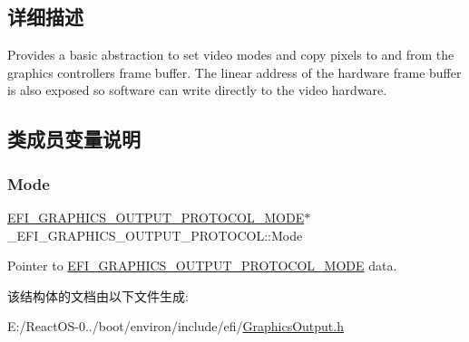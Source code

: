 \subsection{详细描述}
Provides a basic abstraction to set video modes and copy pixels to and from the graphics controller\textquotesingle{}s frame buffer. The linear address of the hardware frame buffer is also exposed so software can write directly to the video hardware. 

\subsection{类成员变量说明}
\mbox{\label{struct___e_f_i___g_r_a_p_h_i_c_s___o_u_t_p_u_t___p_r_o_t_o_c_o_l_ae5fe3c5d2a77b3e1de618adfb0f2e20a}} 
\subsubsection{\texorpdfstring{Mode}{Mode}}
{\footnotesize\ttfamily \hyperlink{struct_e_f_i___g_r_a_p_h_i_c_s___o_u_t_p_u_t___p_r_o_t_o_c_o_l___m_o_d_e}{E\+F\+I\+\_\+\+G\+R\+A\+P\+H\+I\+C\+S\+\_\+\+O\+U\+T\+P\+U\+T\+\_\+\+P\+R\+O\+T\+O\+C\+O\+L\+\_\+\+M\+O\+DE}$\ast$ \+\_\+\+E\+F\+I\+\_\+\+G\+R\+A\+P\+H\+I\+C\+S\+\_\+\+O\+U\+T\+P\+U\+T\+\_\+\+P\+R\+O\+T\+O\+C\+O\+L\+::\+Mode}

Pointer to \hyperlink{struct_e_f_i___g_r_a_p_h_i_c_s___o_u_t_p_u_t___p_r_o_t_o_c_o_l___m_o_d_e}{E\+F\+I\+\_\+\+G\+R\+A\+P\+H\+I\+C\+S\+\_\+\+O\+U\+T\+P\+U\+T\+\_\+\+P\+R\+O\+T\+O\+C\+O\+L\+\_\+\+M\+O\+DE} data. 

该结构体的文档由以下文件生成\+:\begin{DoxyCompactItemize}
\item 
E\+:/\+React\+O\+S-\/0../boot/environ/include/efi/\hyperlink{_graphics_output_8h}{Graphics\+Output.\+h}\end{DoxyCompactItemize}
